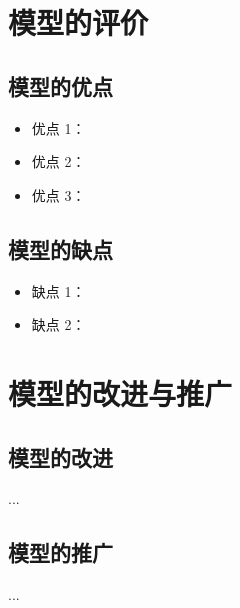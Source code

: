 \section{模型的评价}

\subsection{模型的优点}

\begin{itemize}
	\item 优点 1：
	\item 优点 2：
	\item 优点 3：
\end{itemize}

\subsection{模型的缺点}

\begin{itemize}
	\item 缺点 1：
	\item 缺点 2：
\end{itemize}

\section{模型的改进与推广}

\subsection{模型的改进}

...

\subsection{模型的推广}

...
